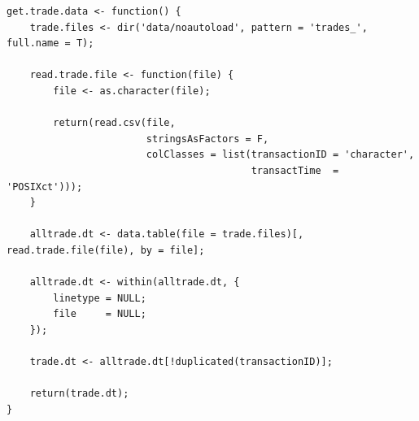 \documentclass[12pt]{beamer}
\begin{document}
\begin{frame}[fragile]

\begin{verbatim}
get.trade.data <- function() {
    trade.files <- dir('data/noautoload', pattern = 'trades_', full.name = T);

    read.trade.file <- function(file) {
        file <- as.character(file);

        return(read.csv(file,
                        stringsAsFactors = F,
                        colClasses = list(transactionID = 'character',
                                          transactTime  = 'POSIXct')));
    }

    alltrade.dt <- data.table(file = trade.files)[, read.trade.file(file), by = file];

    alltrade.dt <- within(alltrade.dt, {
        linetype = NULL;
        file     = NULL;
    });

    trade.dt <- alltrade.dt[!duplicated(transactionID)];

    return(trade.dt);
}
\end{verbatim}
\end{frame}
\end{document}
